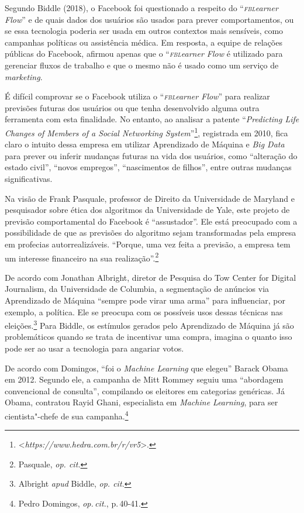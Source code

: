 Segundo Biddle (2018), o Facebook foi questionado a respeito do
``\emph{\textsc{fbl}earner Flow}'' e de quais dados dos usuários são usados para
prever comportamentos, ou se essa tecnologia poderia ser usada em outros
contextos mais sensíveis, como campanhas políticas ou assistência
médica. Em resposta, a equipe de relações públicas do Facebook, afirmou
apenas que o ``\emph{\textsc{fbl}earner Flow} é utilizado para gerenciar fluxos
de trabalho e que o mesmo não é usado como um serviço de \emph{marketing}.

É difícil comprovar se o Facebook utiliza o ``\emph{\textsc{fbl}earner Flow}''
para realizar previsões futuras dos usuários ou que tenha desenvolvido
alguma outra ferramenta com esta finalidade. No entanto, ao analisar a
patente ``\emph{Predicting Life Changes of Members of a Social
Networking System}''\footnote{\textless{}\emph{https://www.hedra.com.br/r/vr5}\textgreater{}.},
registrada em 2010, fica claro o intuito dessa empresa em utilizar
Aprendizado de Máquina e \emph{Big Data} para prever ou inferir mudanças
futuras na vida dos usuários, como ``alteração do estado civil'',
``novos empregos'', ``nascimentos de filhos'', entre outras mudanças
significativas.

Na visão de Frank Pasquale, professor de Direito da Universidade de
Maryland e pesquisador sobre ética dos algoritmos da Universidade de
Yale, este projeto de previsão comportamental do Facebook é
``assustador''. Ele está preocupado com a possibilidade de que as
previsões do algoritmo sejam transformadas pela empresa em profecias
autorrealizáveis. ``Porque, uma vez feita a previsão, a empresa tem um
interesse financeiro na sua realização''.\footnote{Pasquale, \emph{op. cit.}}

De acordo com Jonathan Albright, diretor de Pesquisa do Tow Center for
Digital Journalism, da Universidade de Columbia, a segmentação de
anúncios via Aprendizado de Máquina ``sempre pode virar uma arma'' para
influenciar, por exemplo, a política. Ele se preocupa com os possíveis
usos dessas técnicas nas eleições.\footnote{Albright \emph{apud} Biddle, \emph{op. cit.}}
Para Biddle, os estímulos gerados pelo Aprendizado de Máquina já
são problemáticos quando se trata de incentivar uma compra, imagina o
quanto isso pode ser ao usar a tecnologia para angariar votos.

De acordo com Domingos, ``foi o \emph{Machine Learning} que
elegeu'' Barack Obama em 2012. Segundo ele, a campanha de Mitt Rommey
seguiu uma ``abordagem convencional de consulta'', compilando os
eleitores em categorias genéricas. Já Obama, contratou Rayid Ghani,
especialista em \emph{Machine Learning}, para ser cientista"-chefe de sua
campanha.\footnote{Pedro Domingos, \textit{op.\,cit.}, p.\,40-41.}

